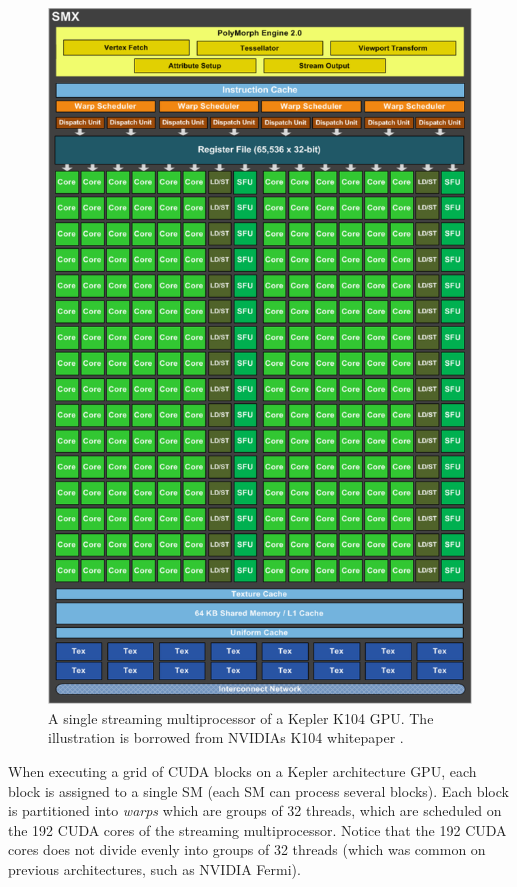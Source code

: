 \begin{figure}
  \centering
  \vspace{5mm}
  \includegraphics[width=\textwidth]{graphics/nvidia_kepler_k104_sm}
  \vspace{4mm}
  \caption{A single streaming multiprocessor of a Kepler K104 GPU. The
    illustration is borrowed from NVIDIAs K104 whitepaper
    \cite{nvidia2012keplerk104}.}
  \label{fig:kepler_sm}
\end{figure}

When executing a grid of CUDA blocks on a Kepler architecture GPU,
each block is assigned to a single SM (each SM can process several
blocks). Each block is partitioned into \textit{warps} which are
groups of 32 threads, which are scheduled on the 192 CUDA cores of the
streaming multiprocessor. Notice that the 192 CUDA cores does not
divide evenly into groups of 32 threads (which was common on previous
architectures, such as NVIDIA Fermi).

